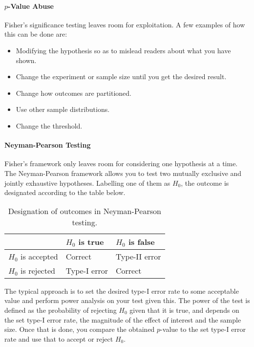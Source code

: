 \paragraph{$p$-Value Abuse}
Fisher's significance testing leaves room for exploitation. A few examples of how this can be done are:
\begin{itemize}
	\item Modifying the hypothesis so as to mislead readers about what you have shown.
	\item Change the experiment or sample size until you get the desired result.
	\item Change how outcomes are partitioned.
	\item Use other sample distributions.
	\item Change the threshold.
\end{itemize}

\paragraph{Neyman-Pearson Testing}
Fisher's framework only leaves room for considering one hypothesis at a time. The Neyman-Pearson framework allows you to test two mutually exclusive and jointly exhaustive hypotheses. Labelling one of them as $H_{0}$, the outcome is designated according to the table below.

\begin{table}[!ht]
	\centering
	\begin{tabular}{| l | l | l |}
		\hline
		                    & $H_{0}$ is true & $H_{0}$ is false \\
		\hline
		$H_{0}$ is accepted & Correct         & Type-II error \\
		\hline
		$H_{0}$ is rejected & Type-I error    & Correct \\
		\hline
	\end{tabular}
	\caption{Designation of outcomes in Neyman-Pearson testing.}
\end{table}

The typical approach is to set the desired type-I error rate to some acceptable value and perform power analysis on your test given this. The power of the test is defined as the probability of rejecting $H_{0}$ given that it is true, and depends on the set type-I error rate, the magnitude of the effect of interest and the sample size. Once that is done, you compare the obtained $p$-value to the set type-I error rate and use that to accept or reject $H_{0}$.

